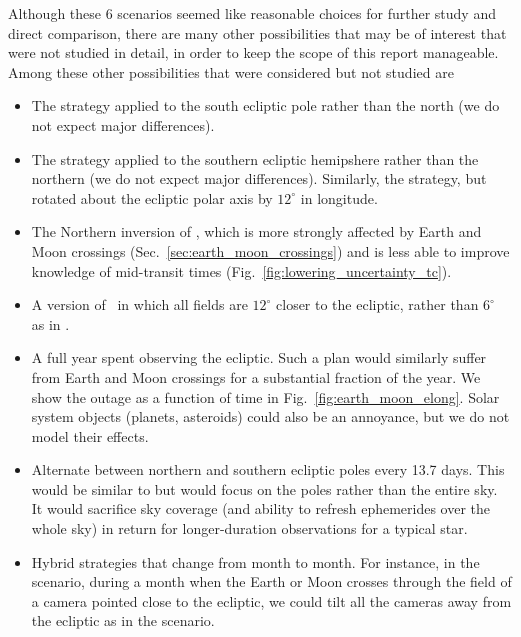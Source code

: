 Although these 6 scenarios seemed like reasonable choices for further study and direct
comparison, there are many other possibilities that may be of interest
that were not studied in detail, in order to keep the scope of this
report manageable.  Among these other possibilities that were considered but not studied are
\begin{itemize}
	\item The \npole\:strategy applied to the south ecliptic pole rather than the north (we do not expect major differences).
	\item The \nhemi\:strategy applied to the southern ecliptic hemipshere rather than the northern (we do not expect major differences).
	Similarly, the \nhemi\:strategy, but rotated about the ecliptic polar axis by
	$12^\circ$ in longitude.
	\item The Northern inversion of \shemiAvoid, which is more strongly 
	affected by Earth and Moon crossings (Sec.~\ref{sec:earth_moon_crossings}) 
	and is less able to 
	improve knowledge of mid-transit times 
	(Fig.~\ref{fig:lowering_uncertainty_tc}).
	\item A version of \nhemi\ in which all fields are $12^\circ$ closer to 
    the ecliptic, rather than $6^\circ$ as in \shemiAvoid.
	\item A full year spent observing the ecliptic.  Such a plan would similarly 
	suffer from Earth and Moon crossings for a substantial fraction of the year.
	We show the outage as a function of time in Fig.~\ref{fig:earth_moon_elong}.
	Solar system objects (planets, asteroids) could also be an annoyance, but
	we do not model their effects.
        \item Alternate between northern and southern ecliptic poles every 13.7 days.
        This would be similar to \hemis\:but would focus on the poles rather than the entire sky.
        It would sacrifice sky coverage (and ability to refresh ephemerides over the whole sky) in return for longer-duration observations for a typical star.
        \item Hybrid strategies that change from month to month.  For instance, in the \nhemi\:scenario, during a month when the Earth or Moon crosses through the field of a camera pointed close to the ecliptic, we could tilt all the cameras away from the ecliptic as in the \npole\:scenario.        
\end{itemize}
